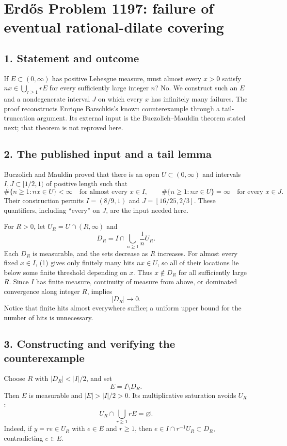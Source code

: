 \section*{Erd\H{o}s Problem 1197: failure of eventual rational-dilate covering}
\subsection*{1. Statement and outcome}
If $E\subset(0,\infty)$ has positive Lebesgue measure, must almost every $x>0$ satisfy $nx\in\bigcup_{r\ge1}rE$ for every sufficiently large integer $n$? No. We construct such an $E$ and a nondegenerate interval $J$ on which every $x$ has infinitely many failures. The proof reconstructs Enrique Barschkis's known counterexample through a tail-truncation argument. Its external input is the Buczolich--Mauldin theorem stated next; that theorem is not reproved here.

\subsection*{2. The published input and a tail lemma}
Buczolich and Mauldin proved that there is an open $U\subset(0,\infty)$ and intervals $I,J\subset[1/2,1)$ of positive length such that
\[
 \#\{n\ge1:nx\in U\}<\infty\quad\text{for almost every }x\in I,
 \qquad
 \#\{n\ge1:nx\in U\}=\infty\quad\text{for every }x\in J. \tag{1}
\]
Their construction permits $I=(8/9,1)$ and $J=[16/25,2/3]$. These quantifiers, including ``every'' on $J$, are the input needed here.

For $R>0$, let $U_R=U\cap(R,\infty)$ and
\[
 D_R=I\cap\bigcup_{n\ge1}\frac1nU_R.
\]
Each $D_R$ is measurable, and the sets decrease as $R$ increases. For almost every fixed $x\in I$, (1) gives only finitely many hits $nx\in U$, so all of their locations lie below some finite threshold depending on $x$. Thus $x\notin D_R$ for all sufficiently large $R$. Since $I$ has finite measure, continuity of measure from above, or dominated convergence along integer $R$, implies
\[
 |D_R|\longrightarrow0. \tag{2}
\]
Notice that finite hits almost everywhere suffice; a uniform upper bound for the number of hits is unnecessary.

\subsection*{3. Constructing and verifying the counterexample}
Choose $R$ with $|D_R|<|I|/2$, and set
\[
 E=I\setminus D_R.
\]
Then $E$ is measurable and $|E|>|I|/2>0$. Its multiplicative saturation avoids $U_R$:
\[
 U_R\cap\bigcup_{r\ge1}rE=\varnothing. \tag{3}
\]
Indeed, if $y=re\in U_R$ with $e\in E$ and $r\ge1$, then $e\in I\cap r^{-1}U_R\subset D_R$, contradicting $e\in E$.

